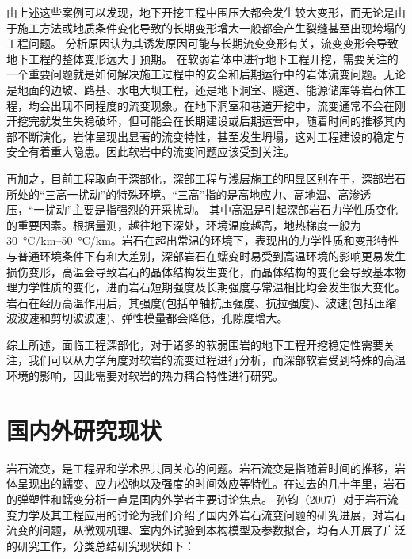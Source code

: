 由上述这些案例可以发现，地下开挖工程中围压大都会发生较大变形，而无论是由于施工方法或地质条件变化导致的长期变形增大一般都会产生裂缝甚至出现垮塌的工程问题。
分析原因认为其诱发原因可能与长期流变变形有关，流变变形会导致地下工程的整体变形远大于预期。
在软弱岩体中进行地下工程开挖，需要关注的一个重要问题就是如何解决施工过程中的安全和后期运行中的岩体流变问题。无论是地面的边坡、路基、水电大坝工程，还是地下洞室、隧道、能源储库等岩石体工程，均会出现不同程度的流变现象。在地下洞室和巷道开挖中，流变通常不会在刚开挖完就发生失稳破坏，但可能会在长期建设或后期运营中，随着时间的推移其内部不断演化，岩体呈现出显著的流变特性，甚至发生坍塌，这对工程建设的稳定与安全有着重大隐患。因此软岩中的流变问题应该受到关注。

再加之，目前工程取向于深部化，深部工程与浅层施工的明显区别在于，深部岩石所处的“三高一扰动”的特殊环境。“三高”指的是高地应力、高地温、高渗透压，“一扰动”主要是指强烈的开采扰动\cite{深部岩体力学基础}。
其中高温是引起深部岩石力学性质变化的重要因素。根据量测，越往地下深处，环境温度越高，地热梯度一般为\SIrange[]{30}{50}{\celsius /km}。岩石在超出常温的环境下，表现出的力学性质和变形特性与普通环境条件下有和大差别，深部岩石在蠕变时易受到高温环境的影响更易发生损伤变形，高温会导致岩石的晶体结构发生变化，而晶体结构的变化会导致基本物理力学性质的变化\cite{Roland1988}，进而岩石短期强度及长期强度与常温相比均会发生很大变化。岩石在经历高温作用后，其强度(包括单轴抗压强度、抗拉强度)、波速(包括压缩波波速和剪切波波速)、弹性模量都会降低，孔隙度增大。

综上所述，面临工程深部化，对于诸多的软弱围岩的地下工程开挖稳定性需要关注，我们可以从力学角度对软岩的流变过程进行分析，而深部软岩受到特殊的高温环境的影响，因此需要对软岩的热力耦合特性进行研究。


\section{国内外研究现状}

岩石流变，是工程界和学术界共同关心的问题。岩石流变是指随着时间的推移，岩体呈现出的蠕变、应力松弛以及强度的时间效应等特性。在过去的几十年里，岩石的弹塑性和蠕变分析一直是国内外学者主要讨论焦点。
孙钧（2007）对于岩石流变力学及其工程应用的讨论为我们介绍了国内外岩石流变问题的研究进展\cite{孙钧2007}，对岩石流变的问题，从微观机理、室内外试验到本构模型及参数拟合，均有人开展了广泛的研究工作，分类总结研究现状如下：


